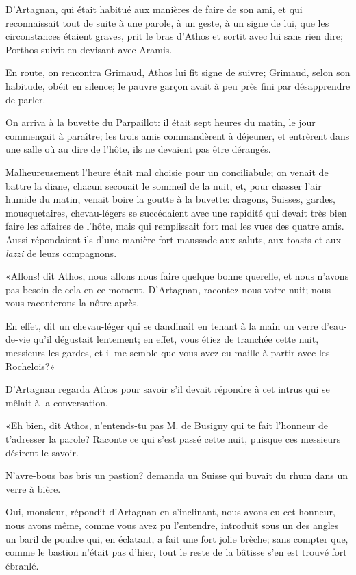 D'Artagnan, qui était habitué aux manières de faire de son ami, et qui reconnaissait tout de suite à une parole, à un geste, à un signe de lui, que les circonstances étaient graves, prit le bras d'Athos et sortit avec lui sans rien dire; Porthos suivit en devisant avec Aramis. 

En route, on rencontra Grimaud, Athos lui fit signe de suivre; Grimaud, selon son habitude, obéit en silence; le pauvre garçon avait à peu près fini par désapprendre de parler. 

On arriva à la buvette du Parpaillot: il était sept heures du matin, le jour commençait à paraître; les trois amis commandèrent à déjeuner, et entrèrent dans une salle où au dire de l'hôte, ils ne devaient pas être dérangés. 

Malheureusement l'heure était mal choisie pour un conciliabule; on venait de battre la diane, chacun secouait le sommeil de la nuit, et, pour chasser l'air humide du matin, venait boire la goutte à la buvette: dragons, Suisses, gardes, mousquetaires, chevau-légers se succédaient avec une rapidité qui devait très bien faire les affaires de l'hôte, mais qui remplissait fort mal les vues des quatre amis. Aussi répondaient-ils d'une manière fort maussade aux saluts, aux toasts et aux \textit{lazzi} de leurs compagnons. 

«Allons! dit Athos, nous allons nous faire quelque bonne querelle, et nous n'avons pas besoin de cela en ce moment. D'Artagnan, racontez-nous votre nuit; nous vous raconterons la nôtre après. 

\speak  En effet, dit un chevau-léger qui se dandinait en tenant à la main un verre d'eau-de-vie qu'il dégustait lentement; en effet, vous étiez de tranchée cette nuit, messieurs les gardes, et il me semble que vous avez eu maille à partir avec les Rochelois?» 

D'Artagnan regarda Athos pour savoir s'il devait répondre à cet intrus qui se mêlait à la conversation. 

«Eh bien, dit Athos, n'entends-tu pas M. de Busigny qui te fait l'honneur de t'adresser la parole? Raconte ce qui s'est passé cette nuit, puisque ces messieurs désirent le savoir. 

\speak  N'avre-bous bas bris un pastion? demanda un Suisse qui buvait du rhum dans un verre à bière. 

\speak  Oui, monsieur, répondit d'Artagnan en s'inclinant, nous avons eu cet honneur, nous avons même, comme vous avez pu l'entendre, introduit sous un des angles un baril de poudre qui, en éclatant, a fait une fort jolie brèche; sans compter que, comme le bastion n'était pas d'hier, tout le reste de la bâtisse s'en est trouvé fort ébranlé. 

